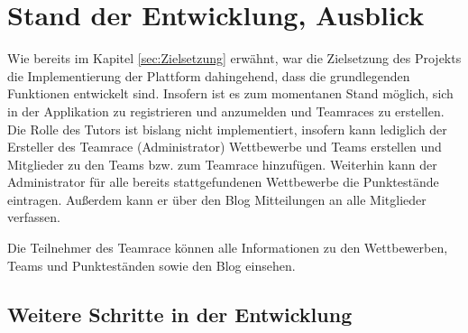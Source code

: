 \documentclass[12pt]{report}
\begin{document}
\chapter{Stand der Entwicklung, Ausblick}
\label{sec:Stand}

Wie bereits im Kapitel \ref{sec:Zielsetzung} erwähnt, war die Zielsetzung des Projekts die Implementierung der Plattform dahingehend, dass die grundlegenden Funktionen entwickelt sind. Insofern ist es zum momentanen Stand möglich, sich in der Applikation zu registrieren und anzumelden und Teamraces zu erstellen. Die Rolle des Tutors ist bislang nicht implementiert, insofern kann lediglich der Ersteller des Teamrace (Administrator) Wettbewerbe und Teams erstellen und Mitglieder zu den Teams bzw. zum Teamrace hinzufügen. Weiterhin kann der Administrator für alle bereits stattgefundenen Wettbewerbe die Punktestände eintragen. Außerdem kann er über den Blog Mitteilungen an alle Mitglieder verfassen.

Die Teilnehmer des Teamrace können alle Informationen zu den Wettbewerben, Teams und Punkteständen sowie den Blog einsehen.

\section{Weitere Schritte in der Entwicklung}
\end{document}
